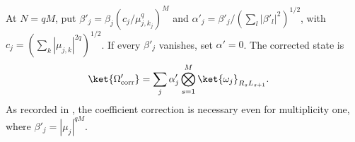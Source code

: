 \begin{definition}
    \label{def:ldp_corrected_canonical_one_copy}
    \leanok
    At $N=qM$, put $\beta'_j=\beta_j(c_j/\mu_{j,k_j}^q)^M$ and
    $\alpha'_j=\beta'_j/(\sum_l|\beta'_l|^2)^{1/2}$, with
    $c_j=(\sum_k|\mu_{j,k}|^{2q})^{1/2}$. If every $\beta'_j$ vanishes, set
    $\alpha'=0$. The corrected state is
    \begin{align}
        \ket{\Omega'_{\mathrm{corr}}}
         & =\sum_j\alpha'_j\bigotimes_{s=1}^M\ket{\omega_j}_{R_sL_{s+1}}.
    \end{align}
    As recorded in \cite{gap:mswc24_repeated_block_corrected_state,gap:mswc24_block_form_mixed_overlap}, the coefficient correction is necessary even for multiplicity one, where
    $\beta'_j=|\mu_j|^{qM}$.
\end{definition}

